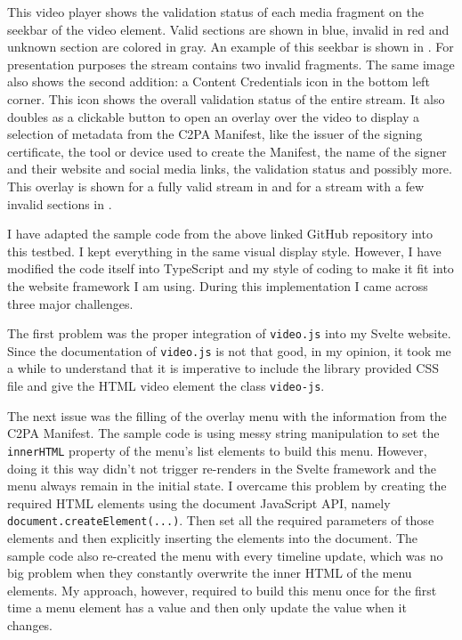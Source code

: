 This video player shows the validation status of each media fragment on the seekbar of the video element. Valid sections are shown in blue, invalid in red and unknown section are colored in gray. An example of this seekbar is shown in . For presentation purposes the stream contains two invalid fragments. The same image also shows the second addition: a Content Credentials icon in the bottom left corner. This icon shows the overall validation status of the entire stream. It also doubles as a clickable button to open an overlay over the video to display a selection of metadata from the C2PA Manifest, like the issuer of the signing certificate, the tool or device used to create the Manifest, the name of the signer and their website and social media links, the validation status and possibly more. This overlay is shown for a fully valid stream in  and for a stream with a few invalid sections in .

I have adapted the sample code from the above linked GitHub repository into this testbed. I kept everything in the same visual display style. However, I have modified the code itself into TypeScript and my style of coding to make it fit into the website framework I am using. During this implementation I came across three major challenges.

The first problem was the proper integration of \texttt{video.js} into my Svelte website. Since the documentation of \texttt{video.js} is not that good, in my opinion, it took me a while to understand that it is imperative to include the library provided CSS file and give the HTML video element the class \texttt{video-js}.

The next issue was the filling of the overlay menu with the information from the C2PA Manifest. The sample code is using messy string manipulation to set the \texttt{innerHTML} property of the menu's list elements to build this menu. However, doing it this way didn't not trigger re-renders in the Svelte framework and the menu always remain in the initial state. I overcame this problem by creating the required HTML elements using the document JavaScript API, namely \texttt{document.createElement(...)}. Then set all the required parameters of those elements and then explicitly inserting the elements into the document. The sample code also re-created the menu with every timeline update, which was no big problem when they constantly overwrite the inner HTML of the menu elements. My approach, however, required to build this menu once for the first time a menu element has a value and then only update the value when it changes.

